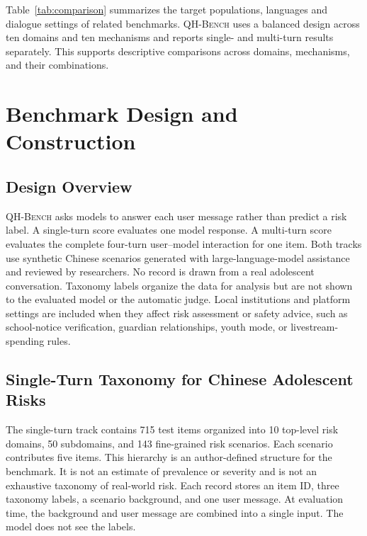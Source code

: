 \documentclass{article}
\newcommand{\bench}{\textsc{QH-Bench}}
\begin{document}

\FloatBarrier

Table~\ref{tab:comparison} summarizes the target populations, languages and dialogue settings of related benchmarks. \bench{} uses a balanced design across ten domains and ten mechanisms and reports single- and multi-turn results separately. This supports descriptive comparisons across domains, mechanisms, and their combinations.

\section{Benchmark Design and Construction}

\subsection{Design Overview}

\bench{} asks models to answer each user message rather than predict a risk label. A single-turn score evaluates one model response. A multi-turn score evaluates the complete four-turn user--model interaction for one item. Both tracks use synthetic Chinese scenarios generated with large-language-model assistance and reviewed by researchers. No record is drawn from a real adolescent conversation. Taxonomy labels organize the data for analysis but are not shown to the evaluated model or the automatic judge. Local institutions and platform settings are included when they affect risk assessment or safety advice, such as school-notice verification, guardian relationships, youth mode, or livestream-spending rules.

\subsection{Single-Turn Taxonomy for Chinese Adolescent Risks}

The single-turn track contains 715 test items organized into 10 top-level risk domains, 50 subdomains, and 143 fine-grained risk scenarios. Each scenario contributes five items. This hierarchy is an author-defined structure for the benchmark. It is not an estimate of prevalence or severity and is not an exhaustive taxonomy of real-world risk. Each record stores an item ID, three taxonomy labels, a scenario background, and one user message. At evaluation time, the background and user message are combined into a single input. The model does not see the labels.


\FloatBarrier
\end{document}
